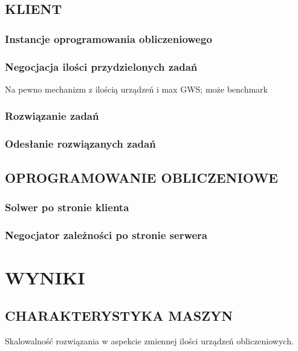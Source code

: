 \documentclass[12pt,a4paper,twoside]{article}
\begin{document}
\subsection{KLIENT}

\subsubsection{Instancje oprogramowania obliczeniowego}

\subsubsection{Negocjacja ilości przydzielonych zadań}
\label{sec:negotiation}

Na pewno mechanizm z ilością urządzeń i max GWS; może benchmark

\subsubsection{Rozwiązanie zadań}

\subsubsection{Odesłanie rozwiązanych zadań}


\subsection{OPROGRAMOWANIE OBLICZENIOWE}

\subsubsection{Solwer po stronie klienta}
\label{sec:solver}

\subsubsection{Negocjator zależności po stronie serwera}


\section{WYNIKI}

\subsection{CHARAKTERYSTYKA MASZYN}

Skalowalność rozwiązania w aspekcie zmiennej ilości urządzeń obliczeniowych.
\end{document}
